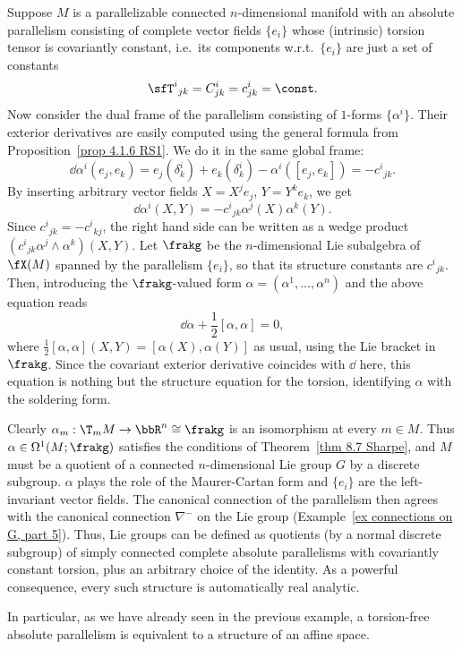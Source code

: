 \begin{example}
    Suppose $M$ is a parallelizable connected $n$-dimensional manifold with an absolute parallelism consisting of complete vector fields $\{e_i\}$ whose (intrinsic) torsion tensor is covariantly constant, i.e.\ its components w.r.t.\ $\{e_i\}$ are just a set of constants
    \[\sfT^i{}_{jk}=C^i_{jk}=c^i_{jk}=\const.\]
    Now consider the dual frame of the parallelism consisting of $1$-forms  $\{\alpha^i\}$. Their exterior derivatives are easily computed using the general formula from Proposition~\ref{prop 4.1.6 RS1}. We do it in the same global frame:
    \[\dd\alpha^i(e_j,e_k)=e_j(\delta^i_k)+e_k(\delta^i_k)-\alpha^i([e_j,e_k])=-c^i{}_{jk}.\]
    By inserting arbitrary vector fields $X=X^j e_j$, $Y=Y^k e_k$, we get 
    \[\dd\alpha^i(X,Y)=-c^i{}_{jk}\alpha^j(X)\alpha^k(Y).\]
    Since $c^i{}_{jk}=-c^i{}_{kj}$, the right hand side can be written as a wedge product $(c^i{}_{jk}\alpha^j\wedge\alpha^k)(X,Y)$. Let $\frakg$ be the $n$-dimensional Lie subalgebra of $\fX(M)$ spanned by the parallelism $\{e_i\}$, so that its structure constants are $c^i{}_{jk}$. Then, introducing the $\frakg$-valued form $\alpha=(\alpha^1,\ldots,\alpha^n)$ and the above equation reads 
    \[\dd\alpha +\frac12[\alpha,\alpha]=0,\]
    where $\frac12[\alpha,\alpha](X,Y)=[\alpha(X),\alpha(Y)]$ as usual, using the Lie bracket in $\frakg$. Since the covariant exterior derivative coincides with $\dd$ here, this equation is nothing but the structure equation for the torsion, identifying $\alpha$ with the soldering form.

    Clearly $\alpha_m:\T_mM\to \bbR^n\cong\frakg$ is an isomorphism at every $m\in M$. Thus $\alpha\in\Omega^1(M;\frakg)$ satisfies the conditions of Theorem~\ref{thm 8.7 Sharpe}, and $M$ must be a quotient of a connected $n$-dimensional Lie group $G$ by a discrete subgroup. $\alpha$ plays the role of the Maurer-Cartan form and $\{e_i\}$ are the left-invariant vector fields. The canonical connection of the parallelism then agrees with the canonical connection $\nabla^-$ on the Lie group (Example~\ref{ex connections on G, part 5}). Thus, Lie groups can be defined as quotients (by a normal discrete subgroup) of simply connected complete absolute parallelisms with covariantly constant torsion, plus an arbitrary choice of the identity. As a powerful consequence, every such structure is automatically real analytic.

    In particular, as we have already seen in the previous example, a torsion-free absolute parallelism is equivalent to a structure of an affine space.
\end{example}

